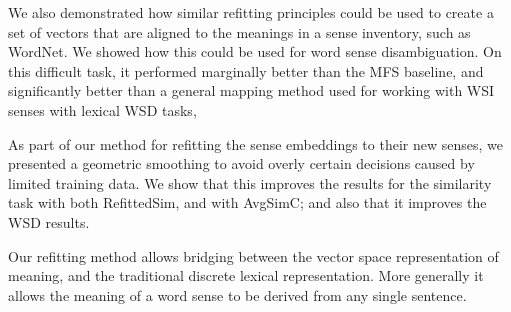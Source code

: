 \documentclass{sig-alternate}
\begin{document}
We also demonstrated how similar refitting principles could be used to create a set of vectors that are aligned to the meanings in a sense inventory, such as WordNet. We showed how this could be used for word sense disambiguation. On this difficult task, it performed marginally better than the MFS baseline, and significantly better than a general mapping method used for working with WSI senses with lexical WSD tasks,

As part of our method for refitting the sense embeddings to their new senses, we presented a geometric smoothing to avoid overly certain decisions caused by limited training data.
We show that this improves the results for the similarity task with both RefittedSim, and with AvgSimC; and also that it improves the WSD results.

Our refitting method allows bridging between the vector space representation of meaning, and the traditional discrete lexical representation. More generally it allows the meaning of a word sense to be derived from any single sentence.

\newpage
\printbibliography
\end{document}
